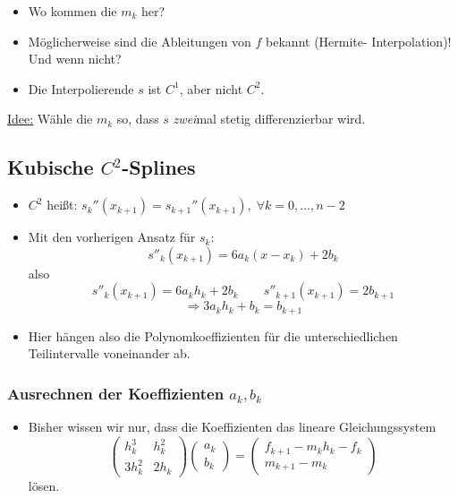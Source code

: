 \begin{itemize}
  \item Wo kommen die $m_k$ her?
  \item Möglicherweise sind die Ableitungen von $f$ bekannt (Hermite- Interpolation)! Und wenn nicht?
  \item Die Interpolierende $s$ ist $C^1$, aber nicht $C^2$.
\end{itemize}

\underline{Idee:} Wähle die $m_k$ so, dass $s$ \emph{zwei}mal stetig differenzierbar wird.

\subsection{Kubische $C^2$-Splines}

\begin{itemize}
  \item $C^2$ heißt: $s_k''(x_{k+1}) = s_{k+1}''(x_{k+1}), \; \forall k=0, \dots, n-2$
  \item Mit den vorherigen Ansatz für $s_k$:
   \begin{equation*}
    s''_k(x_{k+1}) = 6a_k(x-x_k) + 2b_k
   \end{equation*}
   also
   \begin{equation*}
    s''_k(x_{k+1}) = 6 a_kh_k + 2b_k
    \qquad
    s''_{k+1}(x_{k+1}) = 2b_{k+1}
   \end{equation*}
   \begin{equation}
    \label{eq:interpolation:cubic_spline_continuity}
    \Rightarrow 3a_kh_k + b_k = b_{k+1}
   \end{equation}

  \item Hier hängen also die Polynomkoeffizienten für die unterschiedlichen Teilintervalle
    voneinander ab.
\end{itemize}

\subsubsection{Ausrechnen der Koeffizienten $a_k, b_k$}

\begin{itemize}
  \item Bisher wissen wir nur, dass die Koeffizienten das lineare Gleichungssystem
   \begin{equation*}
    \begin{pmatrix}
   h_k^3 & h_k^2 \\
   3h_k^2 & 2h_k
   \end{pmatrix}
   \begin{pmatrix}
   a_k \\
   b_k
   \end{pmatrix}
   =
   \begin{pmatrix}
   f_{k+1} - m_kh_k - f_k\\
   m_{k+1} - m_k
   \end{pmatrix}
  \end{equation*}
 lösen.
\end{itemize}


